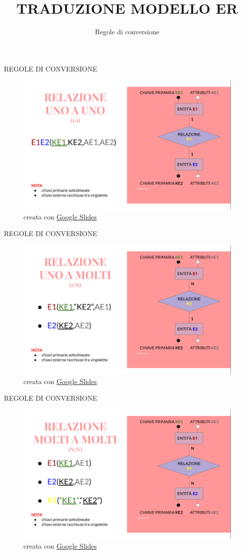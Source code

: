 \documentclass[aspectratio=1610]{beamer}
\title{TRADUZIONE MODELLO ER}
\subtitle{Regole di conversione}
\date{}
\institute{\textit{
        Fonti:
        \begin{itemize}
            \item[-] \href{https://it.wikipedia.org/wiki/Modello_E-R}{Wikipedia}
        \end{itemize}
    }
}
\begin{document}
\begin{frame}
    \titlepage
\end{frame}

\begin{frame}{REGOLE DI CONVERSIONE}
    \begin{figure}
        \includegraphics[width=.9\linewidth]{img/unoAuno.png}
        \caption{{creata con \href{https://docs.google.com/presentation/}{Google Slides}}}
    \end{figure}
\end{frame}

\begin{frame}{REGOLE DI CONVERSIONE}
    \begin{figure}
        \includegraphics[width=.9\linewidth]{img/unoAmolti.png}
        \caption{{creata con \href{https://docs.google.com/presentation/}{Google Slides}}}
    \end{figure}
\end{frame}

\begin{frame}{REGOLE DI CONVERSIONE}
    \begin{figure}
        \includegraphics[width=.9\linewidth]{img/moltiAmolti.png}
        \caption{{creata con \href{https://docs.google.com/presentation/}{Google Slides}}}
    \end{figure}
\end{frame}
\end{document}
